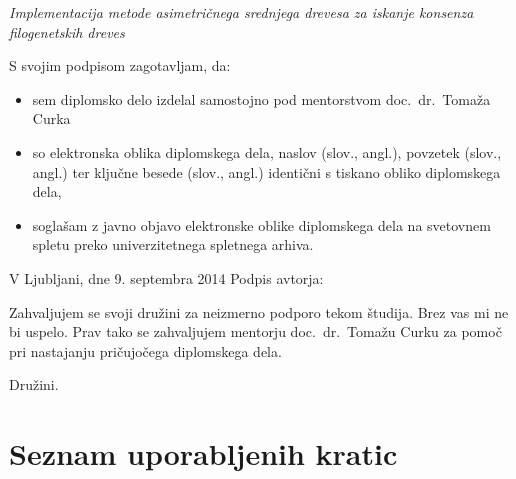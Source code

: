 \documentclass[a4paper, 12pt]{book}
\newcommand{\clearemptydoublepage}{\newpage{\pagestyle{empty}\cleardoublepage}}
\begin{document}
\vspace{0.5cm}
\emph{Implementacija metode asimetričnega srednjega drevesa za iskanje konsenza filogenetskih dreves}

\vspace{1.5cm}
\noindent S svojim podpisom zagotavljam, da:
\begin{itemize}
	\item sem diplomsko delo izdelal samostojno pod mentorstvom
		doc.\ dr.\ Tomaža Curka

	\item	so elektronska oblika diplomskega dela, naslov (slov., angl.), povzetek (slov., angl.) ter ključne besede (slov., angl.) identični s tiskano obliko diplomskega dela,
	\item soglašam z javno objavo elektronske oblike diplomskega dela na svetovnem spletu preko univerzitetnega spletnega arhiva.	
\end{itemize}

\vspace{1cm}
\noindent V Ljubljani, dne 9. septembra 2014 \hfill Podpis avtorja:

\clearemptydoublepage

\thispagestyle{empty}\mbox{}\vfill\null\it%

Zahvaljujem se svoji družini za neizmerno podporo tekom študija. Brez vas mi
ne bi uspelo. Prav tako se zahvaljujem mentorju doc.\ dr.\ Tomažu Curku za 
pomoč pri nastajanju pričujočega diplomskega dela. 
\rm\normalfont

\clearemptydoublepage

\thispagestyle{empty}\mbox{}{\textheight}\mbox{}\hfill\begin{minipage}{0.55\textwidth}%
Družini.
\normalfont\end{minipage}

\clearemptydoublepage

\def\thepage{}%
\setcounter{tocdepth}{3}
\tableofcontents{}


\clearemptydoublepage


\chapter*{Seznam uporabljenih kratic}
\end{document}
